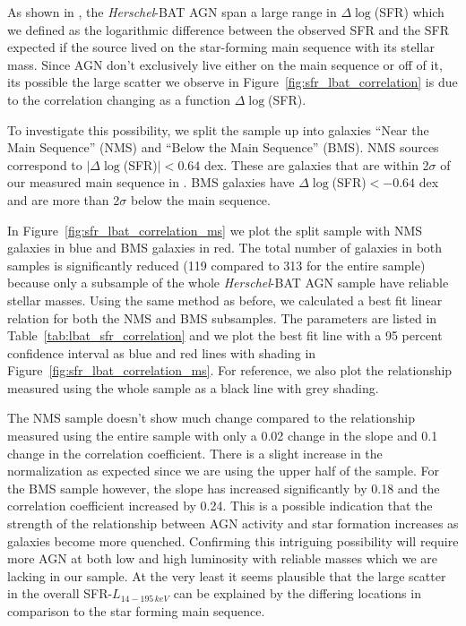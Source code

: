 \documentclass[fleqn, usenatbib]{mnras}
\newcommand{\herschel}{\emph{Herschel}}
\begin{document}
As shown in \citet{Shimizu:2015xo}, the \herschel-BAT AGN span a large range in $\Delta\log$(SFR) which we defined as the logarithmic difference between the observed SFR and the SFR expected if the source lived on the star-forming main sequence with its stellar mass. Since AGN don't exclusively live either on the main sequence or off of it, its possible the large scatter we observe in Figure~\ref{fig:sfr_lbat_correlation} is due to the correlation changing as a function $\Delta\log$(SFR). 

To investigate this possibility, we split the sample up into galaxies ``Near the Main Sequence'' (NMS) and ``Below the Main Sequence'' (BMS). NMS sources correspond to $|\Delta\log$(SFR)$|< 0.64$ dex. These are galaxies that are within 2$\sigma$ of our measured main sequence in \citet{Shimizu:2015xo}. BMS galaxies have $\Delta\log$(SFR)$< -0.64$ dex and are more than 2$\sigma$ below the main sequence. 

In Figure~\ref{fig:sfr_lbat_correlation_ms} we plot the split sample with NMS galaxies in blue and BMS galaxies in red. The total number of galaxies in both samples is significantly reduced (119 compared to 313 for the entire sample) because only a subsample of the whole \herschel-BAT AGN sample have reliable stellar masses. Using the same method as before, we calculated a best fit linear relation for both the NMS and BMS subsamples. The parameters are listed in Table~\ref{tab:lbat_sfr_correlation} and we plot the best fit line with a 95 percent confidence interval as blue and red lines with shading in Figure~\ref{fig:sfr_lbat_correlation_ms}. For reference, we also plot the relationship measured using the whole sample as a black line with grey shading. 

The NMS sample doesn't show much change compared to the relationship measured using the entire sample with only a 0.02 change in the slope and 0.1 change in the correlation coefficient. There is a slight increase in the normalization as expected since we are using the upper half of the sample. For the BMS sample however, the slope has increased significantly by 0.18 and the correlation coefficient increased by 0.24. This is a possible indication that the strength of the relationship between AGN activity and star formation increases as galaxies become more quenched. Confirming this intriguing possibility will require more AGN at both low and high luminosity with reliable masses which we are lacking in our sample. At the very least it seems plausible that the large scatter in the overall SFR-$L_{14-195\,keV}$ can be explained by the differing locations in comparison to the star forming main sequence.
\end{document}
